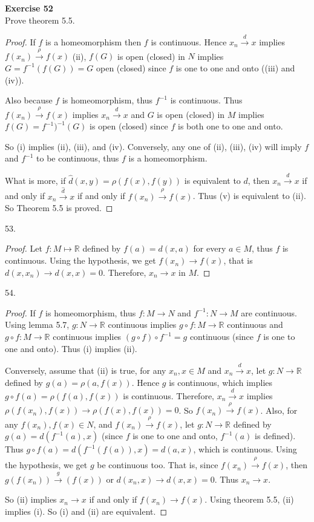 \documentclass[12pt, a4paper]{article}
\theoremstyle{plain}
\newcommand{\R}{\mathbb{R}}
\newenvironment{exercise}[2][Exercise]
    { \begin{mdframed}[backgroundcolor=gray!20] \textbf{#1 #2} \\}
    {  \end{mdframed}}
\begin{document}
\begin{exercise}{52}
Prove theorem 5.5.
\end{exercise}
\begin{proof}
If $f$ is a homeomorphism then $f$ is continuous. Hence $x_n\xrightarrow{d} x$ implies $f(x_n)\xrightarrow{\rho}f(x)$ (ii), $f(G)$ is open (closed) in $N$ implies $G=f^{-1}(f(G))=G$ open (closed) since $f$ is one to one and onto ((iii) and (iv)). 

Also because $f$ is homeomorphism, thus $f^{-1}$ is continuous. Thus $f(x_n)\xrightarrow{\rho} f(x)$ implies $x_n\xrightarrow{d}x$ and $G$ is open (closed) in $M$ implies $f(G) = f^{-1})^{-1}(G)$ is open (closed) since $f$ is both one to one and onto.

So (i) implies (ii), (iii), and (iv). Conversely, any one of (ii), (iii), (iv) will imply $f$ and $f^{-1}$ to be continuous, thus $f$ is a homeomorphism.

What is more, if $\hat{d}(x,y)=\rho(f(x),f(y))$ is equivalent to $d$, then $x_n\xrightarrow{d}x$ if and only if $x_n\xrightarrow{\hat{d}}x$ if and only if $f(x_n)\xrightarrow{\rho} f(x)$. Thus (v) is equivalent to (ii). So Theorem 5.5 is proved.
\end{proof}

\pagebreak

53.
\begin{proof}
Let $f:M\mapsto\R$ defined by $f(a)=d(x,a)$ for every $a\in M$, thus $f$ is continuous. Using the hypothesis, we get $f(x_n)\rightarrow f(x)$, that is $d(x,x_n)\rightarrow d(x,x)=0$. Therefore, $x_n\rightarrow x$ in $M$.
\end{proof}

54.
\begin{proof}
If $f$ is homeomorphism, thus $f:M\rightarrow N$ and $f^{-1}:N\rightarrow M$ are continuous. Using lemma 5.7, $g:N\rightarrow\R$ continuous implies $g\circ f:M\rightarrow\R$ continuous and $g\circ f:M\rightarrow\R$ continuous implies $(g\circ f)\circ f^{-1} = g$ continuous (since $f$ is one to one and onto). Thus (i) implies (ii).

Conversely, assume that (ii) is true, for any $x_n,x\in M$ and $x_n\xrightarrow{d}x$, let $g:N\rightarrow \R$ defined by $g(a)=\rho(a,f(x))$. Hence $g$ is continuous, which implies $g\circ f(a)=\rho(f(a),f(x))$ is continuous. Therefore, $x_n\xrightarrow{d} x$ implies $\rho(f(x_n),f(x))\rightarrow \rho(f(x),f(x)) =0$. So $f(x_n)\xrightarrow{\rho} f(x)$. Also, for any $f(x_n),f(x)\in N$, and $f(x_n)\xrightarrow{\rho} f(x)$, let $g:N\rightarrow \R$ defined by $g(a)=d(f^{-1}(a),x)$ (since $f$ is one to one and onto, $f^{-1}(a)$ is defined). Thus $g\circ f(a)=d(f^{-1}(f(a)),x)=d(a,x)$, which is continuous. Using the hypothesis, we get $g$ be continuous too. That is, since $f(x_n)\xrightarrow{\rho} f(x)$, then $g(f(x_n))\xrightarrow g(f(x))$ or $d(x_n,x)\rightarrow d(x,x)=0$. Thus $x_n\rightarrow x$. 

So (ii) implies $x_n\rightarrow x$ if and only if $f(x_n)\rightarrow f(x)$. Using theorem 5.5, (ii) implies (i). So (i) and (ii) are equivalent.
\end{proof}
\end{document}
